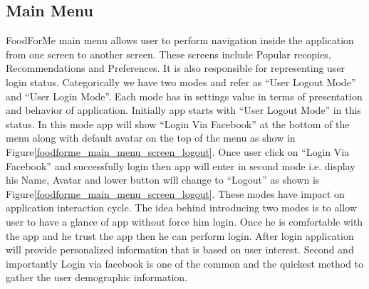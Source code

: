 \subsection{Main Menu}

FoodForMe main menu allows user to perform navigation inside the application from one screen to another screen. These screens include Popular recopies, Recommendations and Preferences. It is also responsible for representing user login status.  Categorically we have two modes and refer as “User Logout Mode” and “User Login Mode”. Each mode has in settings value in terms of presentation and behavior of application. Initially app starts with  “User Logout Mode” in this status. In this mode app will show “Login Via Facebook” at the bottom of the menu along with default avatar on the top of the menu as show in Figure\ref{foodforme_main_menu_screen_logout}. Once user click on “Login Via Facebook” and successfully login then app will enter in second mode i.e. display his Name, Avatar and lower button will change to “Logout” as shown is Figure\ref{foodforme_main_menu_screen_logout}. These modes have impact on application interaction cycle. The idea behind introducing two modes is to allow user to have a glance of app without force him login. Once he is comfortable with the app and he trust the app then he can perform login. After login application will provide personalized information that is based on user interest. Second and importantly Login via facebook is one of the common and the quickest method to gather the user demographic information.

